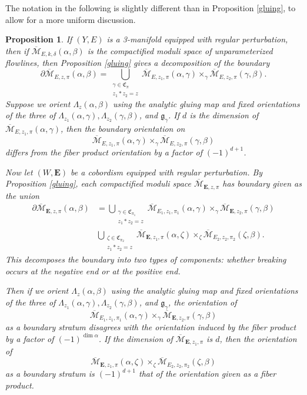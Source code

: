 \documentclass{memo-l}
\newtheorem{proposition}[theorem]{Proposition}
\theoremstyle{definition}
\theoremstyle{remark}
\numberwithin{section}{chapter}
\numberwithin{equation}{chapter}
\begin{document}
The notation in the following is slightly different than in Proposition \ref{gluing}, to allow for a more uniform discussion.

\begin{proposition}\label{boundary-orientation}If $(Y,E)$ is a 3-manifold equipped with regular perturbation, then if $\overline{\mathcal M}_{E,k,\delta}(\alpha, \beta)$ is the compactified moduli space of unparameterized flowlines, then Proposition \ref{gluing} gives a decomposition of the boundary $$\partial \overline{\mathcal M}_{E,z,\pi}(\alpha, \beta) = \bigcup_{\substack{\gamma \in \mathfrak C_\pi\\ z_1 \ast z_2 = z}} \overline{\mathcal M}_{E,z_1,\pi}(\alpha, \gamma) \times_\gamma \overline{\mathcal M}_{E,z_2,\pi}(\gamma, \beta).$$ Suppose we orient $\Lambda_z(\alpha, \beta)$ using the analytic gluing map and fixed orientations of the three of $\Lambda_{z_1}(\alpha, \gamma), \Lambda_{z_2}(\gamma, \beta)$, and $\mathfrak g_\gamma$. If $d$ is the dimension of $\overline{\mathcal M}_{E,z_1,\pi}(\alpha, \gamma)$, then the boundary orientation on $$\overline{\mathcal M}_{E,z_1,\pi}(\alpha, \gamma) \times_\gamma \overline{\mathcal M}_{E,z_2,\pi}(\gamma, \beta)$$ differs from the fiber product orientation by a factor of $(-1)^{d+1}$.

Now let $(W,\mathbf{E})$ be a cobordism equipped with regular perturbation. By Proposition \ref{gluing}, each compactified moduli space $\overline{\mathcal M}_{\mathbf{E},z,\pi}$ has boundary given as the union \begin{align*}\partial \overline{\mathcal M}_{\mathbf E,z,\pi}(\alpha, \beta) &= \bigcup_{\substack{\gamma \in \mathfrak C_{\pi_1}\\ z_1 \ast z_2 = z}} \overline{\mathcal M}_{E_1,z_1,\pi_1}(\alpha, \gamma) \times_\gamma \overline{\mathcal M}_{\mathbf{E},z_2,\pi}(\gamma, \beta)\\
&\bigcup_{\substack{\zeta \in \mathfrak C_{\pi_2}\\ z_1 \ast z_2 = z}} \overline{\mathcal M}_{\mathbf{E},z_1,\pi} (\alpha, \zeta) \times_\zeta \overline{\mathcal M}_{E_2,z_2,\pi_2}(\zeta, \beta).\end{align*} This decomposes the boundary into two types of components: whether breaking occurs at the negative end or at the positive end.

Then if we orient $\Lambda_z(\alpha, \beta)$ using the analytic gluing map and fixed orientations of the three of $\Lambda_{z_1}(\alpha, \gamma), \Lambda_{z_2}(\gamma, \beta)$, and $\mathfrak g_\gamma$, the orientation of $$\overline{\mathcal M}_{E_1,z_1,\pi_1}(\alpha, \gamma) \times_\gamma \overline{\mathcal M}_{\mathbf{E},z_2,\pi}(\gamma, \beta)$$ as a boundary stratum disagrees with the orientation induced by the fiber product by a factor of $(-1)^{\dim \alpha}$. If the dimension of $\overline{\mathcal M}_{\mathbf{E},z_1,\pi}$ is $d$, then the orientation of $$\overline{\mathcal M}_{\mathbf{E},z_1,\pi} (\alpha, \zeta) \times_\zeta \overline{\mathcal M}_{E_2,z_2,\pi_2}(\zeta, \beta)$$ as a boundary stratum is $(-1)^{d+1}$ that of the orientation given as a fiber product.
\end{proposition}
\end{document}
